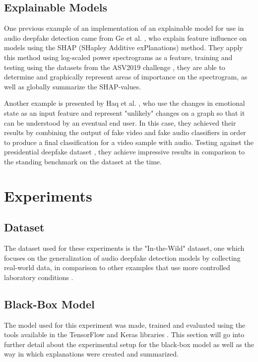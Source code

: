 \documentclass{article}
\begin{document}
	\subsection{Explainable Models}
	One previous example of an implementation of an explainable model for use in audio deepfake
	detection came from Ge et al. \cite{ge_explaining_2024}, who explain feature influence on
	models using the SHAP (SHapley Additive exPlanations) method. They apply this method using
	log-scaled power spectrograms as a feature, training and testing using the datasets from the
	ASV2019 challenge \cite{wang_asvspoof_2020}, they are able to determine and graphically
	represent areas of importance on the spectrogram, as well as globally summarize the
	SHAP-values.
	\par
	Another example is presented by Haq et al. \cite{haq_multimodal_2023}, who use
	the changes in emotional state as an input feature and represent "unlikely" changes on a graph
	so that it can be understood by an eventual end user. In this case, they achieved their
	results by combining the output of fake video and fake audio classifiers in order to produce a
	final classification for a video sample with audio. Testing against the presidential deepfake
	dataset \cite{sankaranarayanan_presidential_nodate}, they achieve impressive results in
	comparison to the standing benchmark on the dataset at the time.
	\section{Experiments}
		\subsection{Dataset}
		The dataset used for these experiments is the "In-the-Wild" dataset, one which focuses on
		the generalization of audio deepfake detection models by collecting real-world data, in
		comparison to other examples that use more controlled laboratory conditions
		\cite{muller_does_2022}.
		\subsection{Black-Box Model}
		The model used for this experiment was made, trained and evaluated using the tools
		available in the TensorFlow and Keras libraries \cite{tensorflow2015-whitepaper}. This
		section will go into further detail about the experimental setup for the black-box model
		as well as the way in which explanations were created and summarized.
\end{document}
